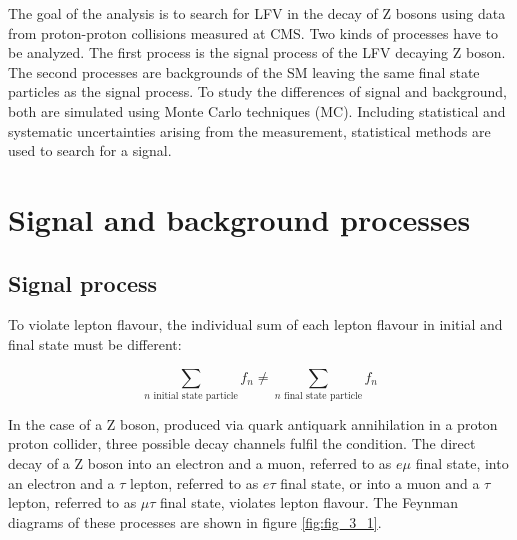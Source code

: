 The goal of the analysis is to search for \gls{LFV} in the decay of Z bosons using data from proton-proton collisions measured at \gls{CMS}. Two kinds of processes have to be analyzed. The first process is the signal process of the \gls{LFV} decaying Z boson. The second processes are backgrounds of the \gls{SM} leaving the same final state particles as the signal process. To study the differences of signal and background, both are simulated using Monte Carlo techniques (\gls{MC}). Including statistical and systematic uncertainties arising from the measurement, statistical methods are used to search for a signal.

\section{Signal and background processes}

\subsection{Signal process}
\label{sec:section_3_1_1}

To violate lepton flavour, the individual sum of each lepton flavour in initial and final state must be different: 

\begin{equation}
	\label{eq:eq_3_1}
	\sum_{n \text{ initial state particle}} f_{n} \neq  \sum_{n \text{ final state particle}} f_{n}
\end{equation}

In the case of a Z boson, produced via quark antiquark annihilation in a proton proton collider, three possible decay channels fulfil the condition. The direct decay of a Z boson into an electron and a muon, referred to as $e\mu$ final state, into an electron and a $\tau$ lepton, referred to as $e\tau$ final state, or into a muon and a $\tau$ lepton, referred to as $\mu\tau$ final state, violates lepton flavour. The Feynman diagrams of these processes are shown in figure \ref{fig:fig_3_1}. \\

